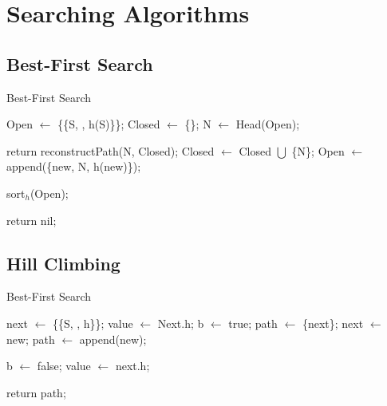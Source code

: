 \newpage
\section{Searching Algorithms}

\subsection{Best-First Search}

\begin{algorithm}[ht]
\caption{Best-First Search}
\begin{algorithmic}
\State Open \(\gets\) \{\{S, , h(S)\}\}; 
\State Closed \(\gets\) \{\}; 
\vspace{0.1cm}
    \State N \(\gets\) Head(Open); 
    
    \vspace{0.07cm}
        \State return reconstructPath(N, Closed); 
    \Else
        \State Closed \(\gets\) Closed \(\bigcup\) \{N\}; 
                \State Open \(\gets\) append(\{new, N, h(new)\}); 
            \EndIf
        \EndFor

        \State sort\(_{h}\)(Open); 
    \EndIf
    \vspace{0.07cm}
\EndWhile

\vspace{0.1cm}
\State return nil; 
\end{algorithmic}
\end{algorithm}


\subsection{Hill Climbing}

\begin{algorithm}[ht]
\caption{Best-First Search}
\begin{algorithmic}
\State next \(\gets\) \{\{S, , h\}\}; 
\State value \(\gets\) Next.h;
\State b \(\gets\) true;
\State path \(\gets\) \{next\};
\vspace{0.1cm}
\State next \(\gets\) new;
\State path \(\gets\) append(new);
\EndIf
\EndFor
    
\State b \(\gets\) false;
\Else
\State value \(\gets\) next.h;
\EndIf
\EndWhile

\vspace{0.1cm}
\State return path; 
\end{algorithmic}
\end{algorithm}



